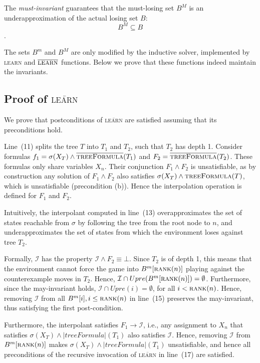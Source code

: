 \documentclass{llncs}
\newcommand{\II}{\mathcal{I}}
\newcommand{\textoverline}[1]{$\overline{\mbox{#1}}$}
\begin{document}
The \emph{must-invariant} guarantees that the must-losing set $B^M$ is an
underapproximation of the actual losing set $B$: $$B^M \subseteq B$$.

The sets $B^m$ and $B^M$ are only modified by the inductive solver, implemented
by \textsc{learn} and \textoverline{\textsc{learn}} functions.  Below we prove that these
functions indeed maintain the invariants.

\subsection{Proof of \textsc{\textoverline{learn}}}

We prove that postconditions of \textsc{\textoverline{learn}} are satisfied
assuming that its preconditions hold.

Line~(11) splits the tree $T$ into $T_1$ and $T_2$, such that $T_2$ has depth
1.  Consider formulas $f_1=\sigma(X_T) \land
\textsc{\textoverline{treeFormula}}(T_1)$ and $F_2 =
\textsc{\textoverline{treeFormula}}(T_2)$.  These formulas only share variables
$X_n$.  Their conjunction $F_1 \land F_2$ is unsatisfiable, as by construction
any solution of $F_1 \land F_2$ also satisfies $\sigma(X_T) \land
\textsc{treeFormula}(T)$, which is unsatisfiable (precondition (b)).  Hence the
interpolation operation is defined for $F_1$ and $F_2$.  

Intuitively, the interpolant computed in line~(13) overapproximates the set of
states reachable from $\sigma$ by following the tree from the root node to $n$,
and underapproximates the set of states from which the environment loses
against tree $T_2$.  

Formally, $\II$ has the property $\II \land F_2 \equiv \bot$.  Since $T_2$ is
of depth 1, this means that the environment cannot force the game into
$B^m[\textsc{rank}(n)]$ playing against the counterexample moves in $T_2$.
Hence, $\II \cap Upre(B^m[\textsc{rank}(n)]) = \emptyset$.  Furthermore, since
the may-invariant holds, $\II \cap Upre(i) = \emptyset$, for all $i <
\textsc{rank}(n)$.  Hence, removing $\II$ from all $B^m[i], i\leq
\textsc{rank}(n)$ in line~(15) preserves the may-invariant, thus satisfying the
first post-condition.

Furthermore, the interpolant satisfies $F_1 \rightarrow \II$, i.e., any
assignment to $X_n$ that satisfies $\sigma(X_T) \land |treeFormula|(T_1)$ also
satisfies $\II$.  Hence, removing $\II$ from $B^m[\textsc{rank}(n)]$ makes
$\sigma(X_T) \land |treeFormula|(T_1)$ unsatisfiable, and hence all
preconditions of the recursive invocation of \textsc{\textoverline{learn}} in
line~(17) are satisfied.  
\end{document}
